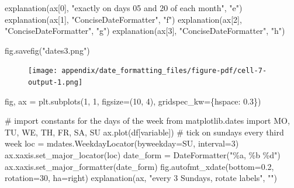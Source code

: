 \documentclass[
  letterpaper,
  DIV=11,
  numbers=noendperiod]{scrreprt}
\newenvironment{Shaded}{\begin{snugshade}}{\end{snugshade}}
\newcommand{\CommentTok}[1]{\textcolor[rgb]{0.37,0.37,0.37}{#1}}
\newcommand{\DecValTok}[1]{\textcolor[rgb]{0.68,0.00,0.00}{#1}}
\newcommand{\FloatTok}[1]{\textcolor[rgb]{0.68,0.00,0.00}{#1}}
\newcommand{\ImportTok}[1]{\textcolor[rgb]{0.00,0.46,0.62}{#1}}
\newcommand{\NormalTok}[1]{\textcolor[rgb]{0.00,0.23,0.31}{#1}}
\newcommand{\OperatorTok}[1]{\textcolor[rgb]{0.37,0.37,0.37}{#1}}
\newcommand{\SpecialCharTok}[1]{\textcolor[rgb]{0.37,0.37,0.37}{#1}}
\newcommand{\StringTok}[1]{\textcolor[rgb]{0.13,0.47,0.30}{#1}}
\begin{document}
\begin{Shaded}
\begin{Highlighting}[]
\NormalTok{explanation(ax[}\DecValTok{0}\NormalTok{], }\StringTok{"exactly on days 05 and 20 of each month"}\NormalTok{, }\StringTok{"e"}\NormalTok{)}
\NormalTok{explanation(ax[}\DecValTok{1}\NormalTok{], }\StringTok{"ConciseDateFormatter"}\NormalTok{, }\StringTok{"f"}\NormalTok{)}
\NormalTok{explanation(ax[}\DecValTok{2}\NormalTok{], }\StringTok{"ConciseDateFormatter"}\NormalTok{, }\StringTok{"g"}\NormalTok{)}
\NormalTok{explanation(ax[}\DecValTok{3}\NormalTok{], }\StringTok{"ConciseDateFormatter"}\NormalTok{, }\StringTok{"h"}\NormalTok{)}

\NormalTok{fig.savefig(}\StringTok{"dates3.png"}\NormalTok{)}
\end{Highlighting}
\end{Shaded}

\begin{figure}[H]

{\centering \texttt{[image: appendix/date\_formatting\_files/figure-pdf/cell-7-output-1.png]}

}

\end{figure}

\begin{Shaded}
\begin{Highlighting}[]
\NormalTok{fig, ax }\OperatorTok{=}\NormalTok{ plt.subplots(}\DecValTok{1}\NormalTok{, }\DecValTok{1}\NormalTok{, figsize}\OperatorTok{=}\NormalTok{(}\DecValTok{10}\NormalTok{, }\DecValTok{4}\NormalTok{),}
\NormalTok{                       gridspec\_kw}\OperatorTok{=}\NormalTok{\{}\StringTok{\textquotesingle{}hspace\textquotesingle{}}\NormalTok{: }\FloatTok{0.3}\NormalTok{\})}

\CommentTok{\# import constants for the days of the week}
\ImportTok{from}\NormalTok{ matplotlib.dates }\ImportTok{import}\NormalTok{ MO, TU, WE, TH, FR, SA, SU}
\NormalTok{ax.plot(df[}\StringTok{\textquotesingle{}variable\textquotesingle{}}\NormalTok{])}
\CommentTok{\# tick on sundays every third week}
\NormalTok{loc }\OperatorTok{=}\NormalTok{ mdates.WeekdayLocator(byweekday}\OperatorTok{=}\NormalTok{SU, interval}\OperatorTok{=}\DecValTok{3}\NormalTok{)}
\NormalTok{ax.xaxis.set\_major\_locator(loc)}
\NormalTok{date\_form }\OperatorTok{=}\NormalTok{ DateFormatter(}\StringTok{"\%a, \%b }\SpecialCharTok{\%d}\StringTok{"}\NormalTok{)}
\NormalTok{ax.xaxis.set\_major\_formatter(date\_form)}
\NormalTok{fig.autofmt\_xdate(bottom}\OperatorTok{=}\FloatTok{0.2}\NormalTok{, rotation}\OperatorTok{=}\DecValTok{30}\NormalTok{, ha}\OperatorTok{=}\StringTok{\textquotesingle{}right\textquotesingle{}}\NormalTok{)}
\NormalTok{explanation(ax, }\StringTok{"every 3 Sundays, rotate labels"}\NormalTok{, }\StringTok{""}\NormalTok{)}
\end{Highlighting}
\end{Shaded}
\end{document}
